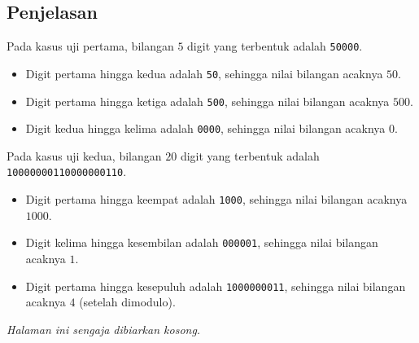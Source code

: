 \documentclass{article}
\begin{document}
\subsection*{Penjelasan}
Pada kasus uji pertama, bilangan $5$ digit yang terbentuk adalah \lstinline{50000}.

\begin{itemize}
    \setlength\itemsep{0pt}
    \item Digit pertama hingga kedua adalah \lstinline{50}, sehingga nilai bilangan acaknya $50$.
    \item Digit pertama hingga ketiga adalah \lstinline{500}, sehingga nilai bilangan acaknya $500$.
    \item Digit kedua hingga kelima adalah \lstinline{0000}, sehingga nilai bilangan acaknya $0$.
\end{itemize}

Pada kasus uji kedua, bilangan $20$ digit yang terbentuk adalah \lstinline{10000000110000000110}.

\begin{itemize}
    \setlength\itemsep{0pt}
    \item Digit pertama hingga keempat adalah \lstinline{1000}, sehingga nilai bilangan acaknya $1000$.
    \item Digit kelima hingga kesembilan adalah \lstinline{000001}, sehingga nilai bilangan acaknya $1$.
    \item Digit pertama hingga kesepuluh adalah \lstinline{1000000011}, sehingga nilai bilangan acaknya $4$ (setelah dimodulo).
\end{itemize}
\newpage
\vspace*{\fill}
\begin{center}
    \textit{Halaman ini sengaja dibiarkan kosong.}
\end{center}
\vspace*{\fill}
\end{document}
